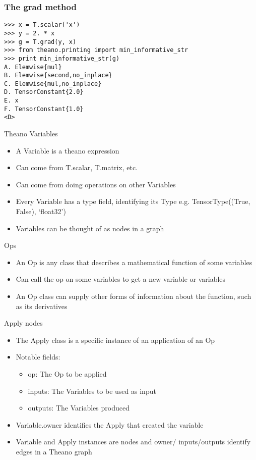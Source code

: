 \documentclass[utf8x,xcolor=pdftex,dvipsnames,table]{beamer}
\begin{document}
\begin{frame}[fragile]
  \frametitle{The grad method}

\begin{lstlisting}
>>> x = T.scalar('x')
>>> y = 2. * x
>>> g = T.grad(y, x)
>>> from theano.printing import min_informative_str
>>> print min_informative_str(g)
A. Elemwise{mul}
B. Elemwise{second,no_inplace}
C. Elemwise{mul,no_inplace}
D. TensorConstant{2.0}
E. x
F. TensorConstant{1.0}
<D>
\end{lstlisting}
\end{frame}

\begin{frame}{Theano Variables}
  \begin{itemize}
  \item A Variable is a theano expression
  \item Can come from T.scalar, T.matrix, etc.
  \item Can come from doing operations on other Variables
  \item Every Variable has a type field, identifying its Type \newline
    e.g. TensorType((True, False), ‘float32’)
  \item Variables can be thought of as nodes in a graph
  \end{itemize}
\end{frame}

\begin{frame}{Ops}

  \begin{itemize}
  \item  An Op is any class that describes a
mathematical function of some variables
  \item Can call the op on some variables to get a
new variable or variables
  \item An Op class can supply other forms of
information about the function, such as its
derivatives
  \end{itemize}
\end{frame}

\begin{frame}{Apply nodes}
  \begin{itemize}
  \item The Apply class is a specific instance of an application of an Op
  \item Notable fields:
    \begin{itemize}
    \item op: The Op to be applied
    \item inputs: The Variables to be used as input
    \item outputs: The Variables produced
    \end{itemize}
  \item Variable.owner identifies the Apply that created the variable
  \item Variable and Apply instances are nodes and owner/
    inputs/outputs identify edges in a Theano graph
  \end{itemize}
\end{frame}
\end{document}
